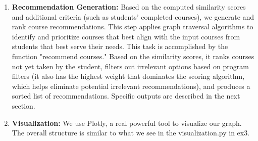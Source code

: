 \documentclass[fontsize=11pt]{article}
\begin{document}
\begin{enumerate}
    \item \textbf{Recommendation Generation:} Based on the computed similarity scores and additional criteria (such as students’ completed courses), we generate and rank course recommendations. This step applies graph traversal algorithms to identify and prioritize courses that best align with the input courses from students that best serve their needs. This task is accomplished by the function "recommend courses." Based on the similarity scores, it ranks courses not yet taken by the student, filters out irrelevant options based on program filters (it also has the highest weight that dominates the scoring algorithm, which helps eliminate potential irrelevant recommendations), and produces a sorted list of recommendations. Specific outputs are described in the next section.
    \item \textbf{Visualization:} We use Plotly, a real powerful tool to visualize our graph. The overall structure is similar to what we see in the visualization.py in ex3.
\end{enumerate}
\end{document}

